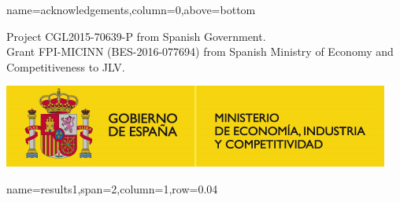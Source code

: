 \documentclass[a0paper,portrait]{baposter}
\begin{document}
\begin{poster}



{name=acknowledgements,column=0,above=bottom}{ 
\smaller %
Project CGL2015-70639-P from Spanish Government.\\ 
Grant FPI-MICINN (BES-2016-077694) from Spanish Ministry of Economy and Competitiveness to JLV.
\begin{center}
{\includegraphics[scale=0.3]{logo-ministerio-de-economia-industria-y-competitividad}} 
\end{center}
}


{name=results1,span=2,column=1,row=0.04}{%

}
\end{poster}
\end{document}
